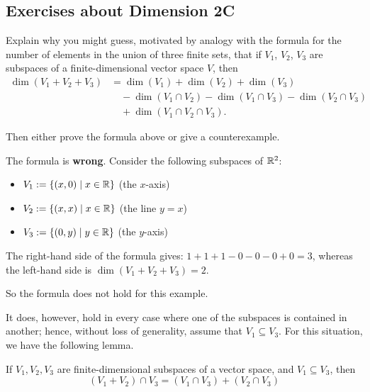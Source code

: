 \subsection*{Exercises about Dimension 2C}

\setcounter{xrcscount}{19}
\begin{xrcs}
  Explain why you might guess, motivated by analogy with the formula for the number of elements in the union of three finite sets, that if $V_1$, $V_2$, $V_3$ are subspaces of a finite-dimensional vector space $V$, then
  \begin{equation}
      \begin{aligned}
      \dim (V_1 + V_2 + V_3) &= \dim (V_1) + \dim (V_2) + \dim (V_3) \\
      & \quad - \dim(V_1 \cap V_2) - \dim (V_1 \cap V_3) - \dim (V_2 \cap V_3) \\
      & \quad + \dim (V_1 \cap V_2 \cap V_3).
    \end{aligned}
  \end{equation}


  Then either prove the formula above or give a counterexample.

  \begin{xsol}
    The formula is \textbf{wrong}. Consider the following subspaces of $\mathbb{R}^2$:
    \begin{itemize}
      \item $V_1 := \{ (x,0) \mid x \in \mathbb{R} \} $ \quad (the $x$-axis) \\
      \item $V_2 := \{ (x,x) \mid x \in \mathbb{R} \} $ \quad (the line $y=x$)
      \item $V_3 := \{ (0,y) \mid y \in \mathbb{R} \} $ \quad (the $y$-axis)
    \end{itemize}

    The right-hand side of the formula gives: $1+1+1-0-0-0+0 = 3$, whereas the left-hand side is $\dim (V_1 + V_2 + V_3) = 2$.

    So the formula does not hold for this example.

    It does, however, hold in every case where one of the subspaces is contained in another; hence, without loss of generality, assume that $V_1 \subseteq V_3$. For this situation, we have the following lemma.

     If $V_1, V_2, V_3$ are finite-dimensional subspaces of a vector space, and $V_1 \subseteq V_3$, then
    \begin{equation}
      \label{eq: lemma}
       (V_1 + V_2) \cap V_3 = (V_1 \cap V_3) + (V_2 \cap V_3)
    \end{equation}


\end{xsol}
\end{xrcs}
